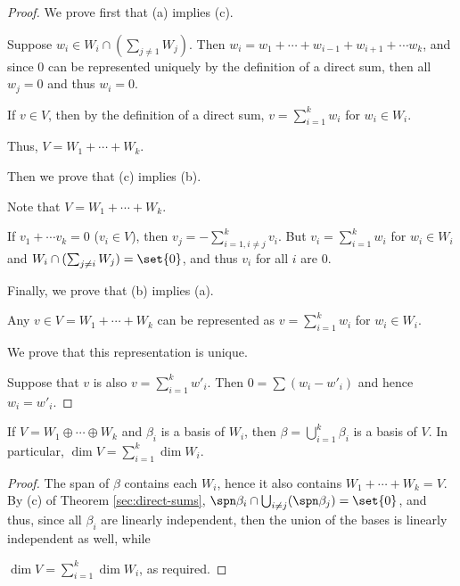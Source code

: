 \documentclass[11pt]{scrartcl}
\begin{document}
\begin{proof}


  We prove first that (a) implies (c).

  Suppose $w_{i} \in W_i\cap (\sum_{j\neq 1}W_j)$. Then
  $w_{i} = w_{1} + \cdots + w_{i-1} + w_{i+1} + \cdots w_{k}$, and
  since $0$ can be represented uniquely by the definition of a direct
  sum, then all $w_{j} = 0$ and thus $w_{i} = 0$.

  If $v \in V$, then by the definition of a direct sum,
  $v = \sum_{i=1}^{k}w_{i}$ for $w_i \in W_i$.

  Thus, $V = W_1 + \cdots + W_k$.

  Then we prove that (c) implies (b).

  Note that $V = W_1 + \cdots + W_k$.

  If $v_1+\cdots v_k = 0$ ($v_i\in V$), then
  $v_{j} = -\sum_{i=1, i \neq j}^{k} v_{i}$. But
  $v_i = \sum_{i=1}^kw_{i}$ for $w_{i} \in W_{i}$ and
  $W_i\cap(\sum_{j\neq i}W_{j}) = \set{0}$, and thus $v_{i}$ for all
  $i$ are 0.

  Finally, we prove that (b) implies (a).

  Any $v\in V =  W_1 + \cdots + W_k$ can be represented as $v=\sum_{i=1}^kw_i $ for $w_i \in W_i$.

  We prove that this representation is unique.

  Suppose that $v$ is also $v = \sum_{i=1}^k w'_{i}$. Then
  $0 = \sum (w_{i} - w'_{i})$ and hence $w_{i} = w'_{i}$.
\end{proof}

\begin{corollary}
  If $V = W_1 \oplus \cdots \oplus W_k$ and $\beta_{i}$ is a basis of $W_i$, then
  $\beta = \bigcup_{i=1}^k\beta_{i}$ is a basis of $V$. In particular,
  $\dim V = \sum_{i=1}^k \dim W_{i}$.
\end{corollary}

\begin{proof}
  The span of $\beta$ contains each $W_{i}$, hence it also contains
  $W_1+\cdots+W_k = V$. By (c) of Theorem \ref{sec:direct-sums},
  $\spn \beta_i \cap \bigcup_{i\neq j} (\spn \beta_{j}) = \set{0}$,
  and thus, since all $\beta_{i}$ are linearly independent, then the
  union of the bases is linearly independent as well, while

  $\dim V = \sum_{i=1}^k \dim W_{i}$, as required.
\end{proof}
\end{document}
